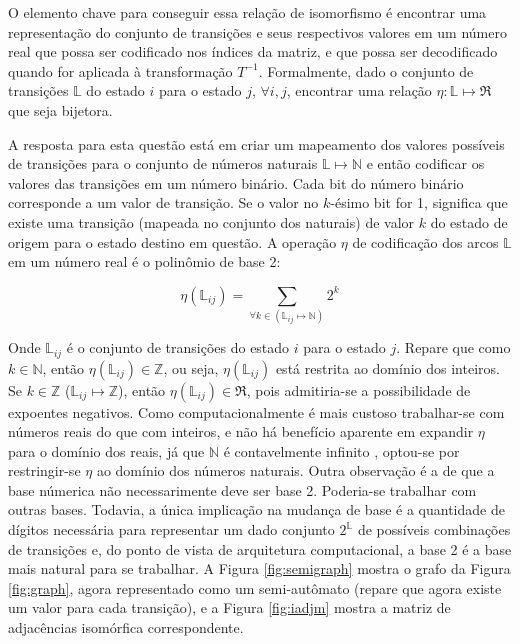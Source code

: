 \documentclass[12pt,a4paper]{article}
\begin{document}
O elemento chave para conseguir essa relação de isomorfismo
é encontrar uma representação do conjunto de transições e
seus respectivos valores em um número real que possa ser codificado
nos índices da matriz, e que possa ser decodificado quando for
aplicada à transformação $T^{-1}$. Formalmente, dado o conjunto de transições
$\mathbb{L}$ do estado $i$ para o estado $j$, $\forall i,j$, encontrar uma
relação $\eta:\mathbb{L} \mapsto \Re$ que seja bijetora.

A resposta para esta questão está em criar um mapeamento dos valores
possíveis de transições para o conjunto de números naturais
$\mathbb{L} \mapsto \mathbb{N}$ e então codificar os valores das transições
em um número binário. Cada bit do número binário corresponde a um valor de
transição. Se o valor no $k$-ésimo bit for 1, significa que existe uma
transição (mapeada no conjunto dos naturais) de valor $k$ do estado de
origem para o estado destino em questão. A operação $\eta$ de codificação dos
arcos $\mathbb{L}$ em um número real é o polinômio de base 2:

\begin{equation}
\eta(\mathbb{L}_{ij}) = \sum_{\forall k \in (\mathbb{L}_{ij} \mapsto \mathbb{N})} 2^k
\end{equation}

Onde $\mathbb{L}_{ij}$ é o conjunto de transições do estado $i$ para o estado
$j$. Repare que como $k \in \mathbb{N}$, então $\eta(\mathbb{L}_{ij}) \in \mathbb{Z}$,
ou seja, $\eta(\mathbb{L}_{ij})$ está restrita ao domínio dos inteiros. Se
$k \in \mathbb{Z}$ ($\mathbb{L}_{ij} \mapsto \mathbb{Z}$), então
$\eta(\mathbb{L}_{ij}) \in \Re$, pois admitiria-se a possibilidade de expoentes negativos.
Como computacionalmente é mais custoso trabalhar-se com números reais do que com inteiros,
e não há benefício aparente em expandir $\eta$ para o domínio dos reais,
já que $\mathbb{N}$ é contavelmente infinito , optou-se
por restringir-se $\eta$ ao domínio dos números naturais. Outra observação
é a de que a base númerica não necessarimente deve ser base 2. Poderia-se trabalhar com outras
bases. Todavia, a única implicação na mudança de base é a quantidade de dígitos
necessária para representar um dado conjunto $2^{\mathbb{L}}$ de possíveis combinações de
transições e, do ponto de vista de arquitetura computacional, a base 2 é a
base mais natural para se trabalhar. A Figura \ref{fig:semigraph}
mostra o grafo da Figura \ref{fig:graph}, agora representado como um semi-autômato
(repare que agora existe um valor para cada transição), e a Figura \ref{fig:iadjm}
mostra a matriz de adjacências isomórfica correspondente.
\end{document}
